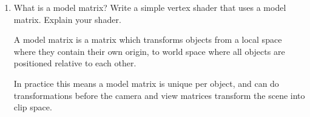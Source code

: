 \documentclass{article}
\begin{document}
\begin{enumerate}
            \begin{enumerate}
                \item Show the equation to compute $p'$ from $p$.
                    \begin{mdframed}
                        \begin{displaymath}
                            x' = x S_x
                        \end{displaymath}
                        \begin{displaymath}
                            y' = y S_y
                        \end{displaymath}
                        \begin{displaymath}
                            z' = z S_z
                        \end{displaymath}
                    \end{mdframed}
                \item Show the $4 \times 4$ transformation matrix.
                    \begin{mdframed}
                        \begin{displaymath}
                            M = 
                            \begin{bmatrix}
                                S_x & 0 & 0 & 0\\
                                0 & S_y & 0 & 0\\
                                0 & 0 & S_z & 0\\
                                0 & 0 & 0 & 1
                            \end{bmatrix}
                        \end{displaymath}
                    \end{mdframed}
            \end{enumerate}

        \item What is a model matrix? Write a simple vertex shader that uses a model matrix. Explain your
            shader.

            \begin{mdframed}
                A model matrix is a matrix which transforms objects from
                a local space where they contain their own origin, to world
                space where all objects are positioned relative to each other.

                In practice this means a model matrix is unique per object,
                and can do transformations before the camera and view matrices
                transform the scene into clip space.



\end{mdframed}
\end{enumerate}
\end{document}
